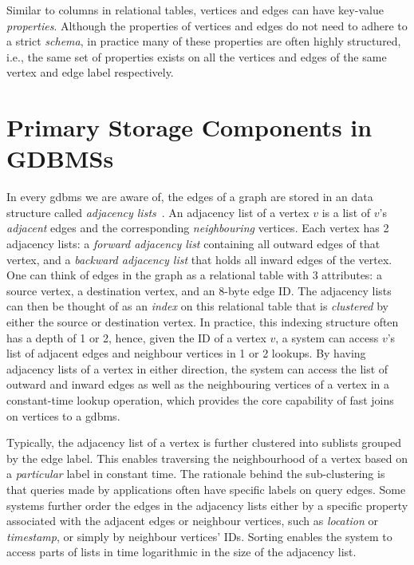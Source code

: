 Similar to columns in relational tables, vertices and edges can have key-value \emph{properties}. Although the properties of vertices and edges do not need to adhere to a strict \emph{schema}, in practice many of these properties are often highly structured, i.e., the same set of properties exists on all the vertices and edges of the same vertex and edge label respectively.

\section{Primary Storage Components in GDBMSs}
\label{sec:storage-components}

In every \gls{gdbms} we are aware of, the edges of a graph are stored in an data structure called \emph{adjacency lists}~\cite{bonifati-adj-lists}. An adjacency list of a vertex $v$ is a list of $v$'s \emph{adjacent} edges and the corresponding  \emph{neighbouring} vertices. Each vertex has 2 adjacency lists: a \emph{forward adjacency list} containing all outward edges of that vertex, and a \emph{backward adjacency list} that holds all inward edges of the vertex. One can think of edges in the graph as a relational table with 3 attributes: a source vertex, a destination vertex, and an 8-byte edge ID. The adjacency lists can then be thought of as an \emph{index} on this relational table that is \emph{clustered} by either the source or destination vertex. In practice, this indexing structure often has a depth of 1 or 2, hence, given the ID of a vertex $v$, a system can access $v$'s list of adjacent edges and neighbour vertices in 1 or 2 lookups. By having adjacency lists of a vertex in either direction, the system can access the list of outward and inward edges as well as the neighbouring vertices of a vertex in a constant-time lookup operation, which provides the core capability of fast joins on vertices to a \gls{gdbms}. 

Typically, the adjacency list of a vertex is further clustered into sublists grouped by the edge label. This enables traversing the neighbourhood of a vertex based on a \emph{particular} label in constant time. The rationale behind the sub-clustering is that queries made by applications often have specific labels on query edges. Some systems further order the edges in the adjacency lists either by a specific property associated with the adjacent edges or neighbour vertices, such as \emph{location} or \emph{timestamp}, or simply by neighbour vertices' IDs. Sorting enables the system to access parts of lists in time logarithmic in the size of the adjacency list.

